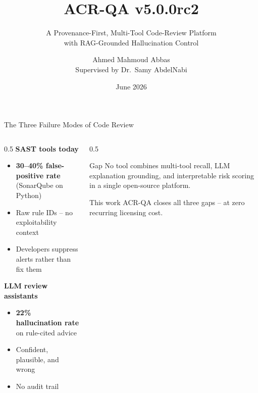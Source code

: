 \documentclass[aspectratio=169,12pt]{beamer}
\title{ACR-QA v5.0.0rc2}
\subtitle{A Provenance-First, Multi-Tool Code-Review Platform\\
          with RAG-Grounded Hallucination Control}
\author{Ahmed Mahmoud Abbas\\
        \small Supervised by Dr.\ Samy AbdelNabi}
\institute{Department of Computer Science\\King Salman International University (KSIU)}
\date{June 2026}
\newcommand{\bad}[1]{\textbf{\color{acrRed}#1}}
\begin{document}
\begin{frame}
  \titlepage
\end{frame}

\begin{frame}{The Three Failure Modes of Code Review}
  \begin{columns}[T]
    \begin{column}{0.5\textwidth}
      \textbf{SAST tools today}
      \begin{itemize}
        \item \bad{30--40\% false-positive rate} (SonarQube on Python)
        \item Raw rule IDs -- no exploitability context
        \item Developers suppress alerts rather than fix them
      \end{itemize}
      \vspace{4pt}
      \textbf{LLM review assistants}
      \begin{itemize}
        \item \bad{22\% hallucination rate} on rule-cited advice\footnotemark
        \item Confident, plausible, and wrong
        \item No audit trail
      \end{itemize}
    \end{column}
    \begin{column}{0.5\textwidth}
      \begin{alertblock}{Gap}
        No tool combines multi-tool recall, LLM explanation grounding,
        and interpretable risk scoring in a single open-source platform.
      \end{alertblock}
      \vspace{6pt}
      \begin{exampleblock}{This work}
        ACR-QA closes all three gaps -- at zero recurring licensing cost.
      \end{exampleblock}
    \end{column}
  \end{columns}
\end{frame}
\end{document}
